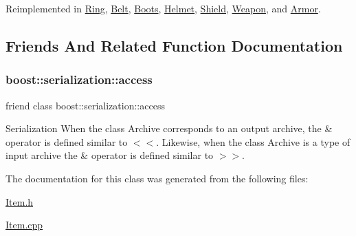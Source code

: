 Reimplemented in \hyperlink{class_ring_a9170e11e83f0a5b8443e9267e5bd6c8a}{Ring}, \hyperlink{class_belt_ab374477dd9d966e6e6b81b3699afd939}{Belt}, \hyperlink{class_boots_aac6123a5f117993f276eb5f2f343eeb0}{Boots}, \hyperlink{class_helmet_aa840a7be0b69b5b3d60398c22d00537f}{Helmet}, \hyperlink{class_shield_af28f146ed96720bd007a62a5871cd206}{Shield}, \hyperlink{class_weapon_afa7ce016c3cba686399cbe57628f8c70}{Weapon}, and \hyperlink{class_armor_a97b69f2691b172bd79e256a487a7f204}{Armor}.



\subsection{Friends And Related Function Documentation}
\hypertarget{class_item_ac98d07dd8f7b70e16ccb9a01abf56b9c}{}\label{class_item_ac98d07dd8f7b70e16ccb9a01abf56b9c} 
\subsubsection{\texorpdfstring{boost\+::serialization\+::access}{boost::serialization::access}}
{\footnotesize\ttfamily friend class boost\+::serialization\+::access\hspace{0.3cm}{\ttfamily [friend]}}

Serialization When the class Archive corresponds to an output archive, the \& operator is defined similar to $<$$<$. Likewise, when the class Archive is a type of input archive the \& operator is defined similar to $>$$>$. 

The documentation for this class was generated from the following files\+:\begin{DoxyCompactItemize}
\item 
\hyperlink{_item_8h}{Item.\+h}\item 
\hyperlink{_item_8cpp}{Item.\+cpp}\end{DoxyCompactItemize}
